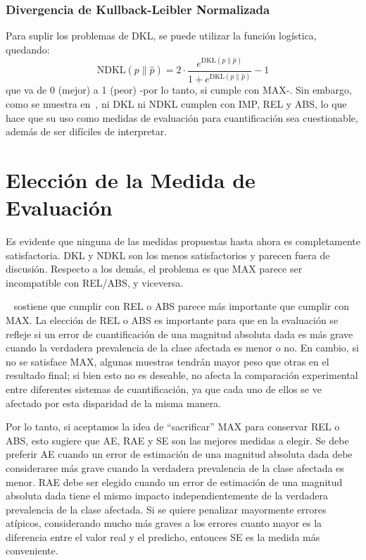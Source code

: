 \subsubsection{Divergencia de Kullback-Leibler
Normalizada}\label{evaluacion:ndkl}

Para suplir los problemas de DKL, se puede utilizar la función logística,
quedando:
\begin{equation}
    {\text{NDKL}}(p\parallel \hat{p}) = 2 \cdot \frac{e^{{\text{DKL}}(p\parallel \hat{p})}}{1+e^{{\text{DKL}}(p\parallel \hat{p})}}-1\label{evaluacion:eq_ndkl}
\end{equation}
que va de {0} (mejor) a {1} (peor) -por lo tanto, si cumple con MAX-. Sin
embargo, como se muestra en~\cite{sebastiani2020evaluation}, ni DKL ni NDKL
cumplen con IMP, REL y ABS, lo que hace que su uso como medidas de evaluación
para cuantificación sea cuestionable, además de ser difíciles de interpretar.

\section{Elección de la Medida de Evaluación}\label{evaluacion:eleccion}

Es evidente que ninguna de las medidas propuestas hasta ahora es completamente
satisfactoria. DKL y NDKL son los menos satisfactorios y parecen fuera de
discusión. Respecto a los demás, el problema es que MAX parece ser incompatible
con REL/ABS, y viceversa.

~\citet{sebastiani2020evaluation} sostiene que cumplir con REL o ABS parece más
importante que cumplir con MAX. La elección de REL o ABS es importante para que
en la evaluación se refleje si un error de cuantificación de una magnitud
absoluta dada es más grave cuando la verdadera prevalencia de la clase afectada
es menor o no. En cambio, si no se satisface MAX, algunas muestras tendrán mayor
peso que otras en el resultado final; si bien esto no es deseable, no afecta la
comparación experimental entre diferentes sistemas de cuantificación, ya que
cada uno de ellos se ve afectado por esta disparidad de la misma manera.

Por lo tanto, si aceptamos la idea de “sacrificar” MAX para conservar REL o ABS,
esto sugiere que AE, RAE y SE son las mejores medidas a elegir. Se debe preferir
AE cuando un error de estimación de una magnitud absoluta dada debe considerarse
más grave cuando la verdadera prevalencia de la clase afectada es menor. RAE
debe ser elegido cuando un error de estimación de una magnitud absoluta dada
tiene el mismo impacto independientemente de la verdadera prevalencia de la
clase afectada. Si se quiere penalizar mayormente errores atípicos, considerando
mucho más graves a los errores cuanto mayor es la diferencia entre el valor real
y el predicho, entonces SE es la medida más conveniente.

